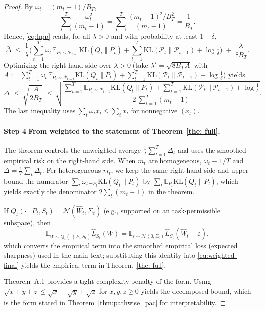 \documentclass{article}
\theoremstyle{plain}
\theoremstyle{definition}
\theoremstyle{remark}
\begin{document}
\begin{proof}
By $\omega_t=(m_t-1)/B_T$,
\[
\sum_{t=1}^T \frac{\omega_t^2}{(m_t-1)}
=\sum_{t=1}^T \frac{(m_t-1)^2/B_T^2}{(m_t-1)}
=\frac{1}{B_T}.
\]
Hence, \eqref{eq:hpp} reads, for all $\lambda>0$ and with probability at least $1-\delta$,
\begin{equation}
\label{eq:gap-preopt}
\bar\Delta
\;\le\;
\frac{1}{\lambda}\Big(
\sum_{t=1}^T \omega_t\,\mathbb E_{P_t\sim\mathcal P_{t-1}}\mathrm{KL}(Q_t\|P_t)
+ \sum_{t=1}^T \mathrm{KL}(\mathcal P_t\|\mathcal P_{t-1})
+ \log\tfrac1\delta\Big)
\;+\;
\frac{\lambda}{8B_T}.
\end{equation}
Optimizing the right-hand side over $\lambda>0$ (take $\lambda^\star=\sqrt{8B_T\,A}$ with
$A:=\sum_{t=1}^T \omega_t\,\mathbb E_{P_t\sim\mathcal P_{t-1}}\mathrm{KL}(Q_t\|P_t)
+ \sum_{t=1}^T \mathrm{KL}(\mathcal P_t\|\mathcal P_{t-1}) + \log\tfrac1\delta$) yields
\begin{equation}
\label{eq:weighted-final}
\bar\Delta
\;\le\;
\sqrt{\frac{A}{2B_T}}
\;\le\;
\sqrt{\frac{
\sum_{t=1}^T \mathbb E_{P_t\sim\mathcal P_{t-1}}\mathrm{KL}(Q_t\|P_t)
+ \sum_{t=1}^T \mathrm{KL}(\mathcal P_t\|\mathcal P_{t-1})
+ \log\tfrac1\delta}{2\,\sum_{t=1}^T (m_t-1)}}.
\end{equation}
The last inequality uses $\sum_t \omega_t x_t \le \sum_t x_t$ for nonnegative $(x_t)$.

\paragraph{Step 4 From weighted to the statement of Theorem~\ref{the: full}.}
The theorem controls the unweighted average $\frac1T\sum_{t=1}^T \Delta_t$ and uses the smoothed empirical risk on the right-hand side.
When $m_t$ are homogeneous, $\omega_t\equiv 1/T$ and $\bar\Delta=\frac1T\sum_t\Delta_t$.
For heterogeneous $m_t$, we keep the same right-hand side and upper-bound the numerator $\sum_t \omega_t \mathbb E_{P_t}\mathrm{KL}(Q_t\|P_t)$ by $\sum_t \mathbb E_{P_t}\mathrm{KL}(Q_t\|P_t)$, which yields exactly the denominator $2\sum_t(m_t-1)$ in the theorem.


If $Q_t(\cdot\mid P_t,S_t)=\mathcal N(\hat W_t,\Sigma_t)$ (e.g., supported on an task-permissible subspace), then
\[
\mathbb E_{W\sim Q_t(\cdot\mid P_t,S_t)}\hat L_{S_t}(W)
=\mathbb E_{\varepsilon\sim\mathcal N(0,\Sigma_t)}\hat L_{S_t}(\hat W_t+\varepsilon),
\]
which converts the empirical term into the smoothed empirical loss (expected sharpness) used in the main text; substituting this identity into \eqref{eq:weighted-final} yields the empirical term in Theorem~\ref{the: full}.

Theorem~A.1 provides a tight complexity penalty of the form.
Using $\sqrt{x+y+z}\le \sqrt{x}+\sqrt{y}+\sqrt{z}$ for $x,y,z\ge 0$ yields the decomposed bound, which is the form stated in Theorem~\ref{thm:pathwise_pac} for interpretability.

\end{proof}
\end{document}
